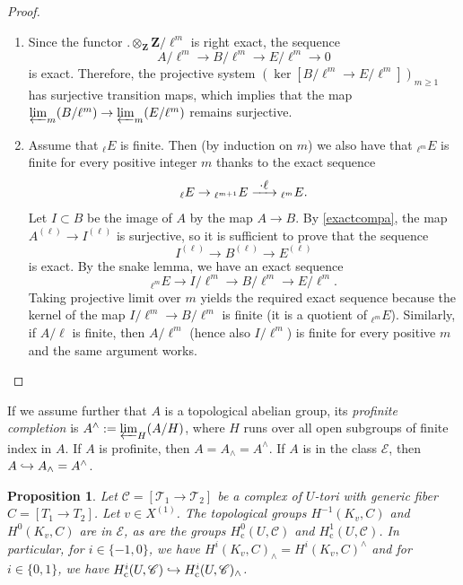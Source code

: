 \documentclass[11pt]{article}
\newcommand{\skpt}{\smallskip}
\let\mathcal\mathscr
\newenvironment{enumeratea}
{\bgroup\def\theenumi{\alph{enumi}}\begin{enumerate}}
{\end{enumerate}\egroup}
\newcommand\hto{\mathrel{\lhook\joinrel\to}}
\newcommand\To[1]{\mathchoice{\xrightarrow{\textstyle\kern4pt#1\kern3pt}}{\stackrel{#1}{\longrightarrow}}{}{}}
\newcommand{\rc}{\mathrm{c}}
\theoremstyle{plain}
\newtheorem{prop}[theo]{Proposition}
\theoremstyle{definition}
\newcommand \ZZ {\mathbf{Z}}
\newcommand \cT {\mathcal{T}}
\newcommand \cC {\mathcal{C}}
\begin{document}
\skpt
\begin{proof}
\begin{enumeratea}
\item
Since the functor $. \otimes_{\ZZ} \ZZ/\ell^m$ is right exact,
the sequence
\[
A/\ell^m \to B/\ell^m \to E/\ell^m \to 0
\]
is exact. Therefore, the projective system
$(\ker [B/\ell^m \to E/\ell^m])_{m \geq 1}$
has surjective transition maps, which
implies that the map $\varprojlim_m (B/\ell^m) \to \varprojlim_m (E/\ell^m)$
remains surjective.

\item
Assume that $_{\ell} E $ is finite. Then
(by induction on $m$) we also have that $_{\ell^m} E$ is finite
for every positive integer $m$ thanks to the exact sequence
\[
_{\ell} E \to{}_{\ell^{m+1}} E \To{\cdot\ell}{}_{\ell^m} E.
\]
Let $I \subset B$ be the image of $A$ by the map $A \to B$.
By \eqref{exactcompa}, the map $A^{(\ell)} \to I^{(\ell)}$ is surjective, so
it is sufficient to prove that the sequence
\[
I^{(\ell)} \to B^{(\ell)} \to E^{(\ell)}
\]
is exact. By the snake lemma, we have an exact sequence
\[
_{\ell^m} E \to I/\ell^m \to B/\ell^m \to E/\ell^m.
\]
Taking projective limit over $m$ yields the required exact sequence
because the kernel of the map $I/\ell^m \to B/\ell^m$ is finite
(it is a quotient of $_{\ell^m} E$). Similarly, if $A/\ell$ is finite,
then $A/\ell^m$ (hence also $I/\ell^m$) is finite for every positive
$m$ and the same argument works.\qedhere
\end{enumeratea}
\end{proof}

If we assume further that $A$ is a topological
abelian group, its \emph{profinite completion} is
$A^{\wedge}:=\varprojlim_H (A/H)$,
where $H$ runs over all open subgroups of finite index
in $A$. If $A$ is profinite, then $A=A_{\wedge}=A^{\wedge}$. If $A$ is in
the class $\mathcal E$, then $A \hto A_{\wedge}=A^{\wedge}$.

\begin{prop} \label{injectcompl}
Let $\mathcal C=[\cT_1 \to \cT_2]$ be a complex of $U$-tori with generic fiber
$C=[T_1 \to T_2]$. Let $v \in X^{(1)}$.
The topological groups $H^{-1}(K_v,C)$ and $H^0(K_v,C)$ are
in $\mathcal E$, as are
the groups $H^0_\rc(U,\cC)$ and $H^1_\rc(U,\cC)$. In particular, for
$i \in \{-1, 0\}$, we have $H^i(K_v,C)_{\wedge}=H^i(K_v,C)^{\wedge}$
and for $i \in \{0, 1\}$, we have $H^i_\rc(U,\cC) \hto
H^i_\rc(U,\cC)_{\wedge}$.
\end{prop}
\end{document}
